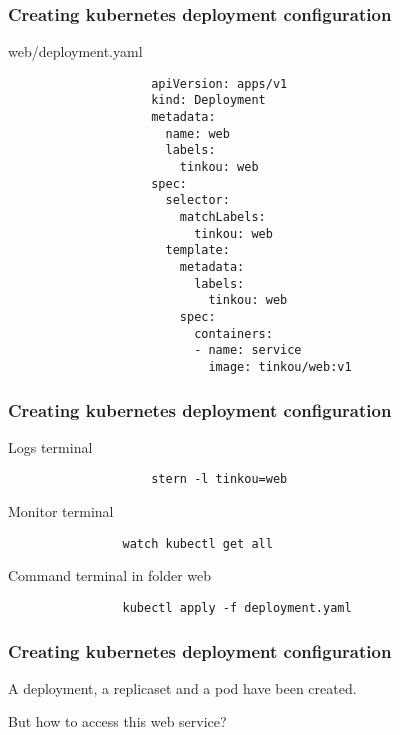 	\begin{frame}[fragile]
		\frametitle{Creating kubernetes deployment configuration}
		\begin{block}{web/deployment.yaml}
			\begin{tiny}
				\begin{verbatim}
					apiVersion: apps/v1
					kind: Deployment
					metadata:
					  name: web
					  labels:
					    tinkou: web
					spec:
					  selector:
					    matchLabels:
					      tinkou: web
					  template:
					    metadata:
					      labels:
					        tinkou: web
					    spec:
					      containers:
					      - name: service
					        image: tinkou/web:v1
				\end{verbatim}
			\end{tiny}
		\end{block}
	\end{frame}
	
	\begin{frame}[fragile]
		\frametitle{Creating kubernetes deployment configuration}

		\begin{block}{Logs terminal}
			\begin{small}
				\begin{verbatim}
					stern -l tinkou=web
				\end{verbatim}
			\end{small}
		\end{block}
		
		\begin{block}{Monitor terminal}
			\begin{verbatim}
				watch kubectl get all
			\end{verbatim}
		\end{block}
		
		\begin{block}{Command terminal in folder web}
			\begin{verbatim}
				kubectl apply -f deployment.yaml
			\end{verbatim}
		\end{block}
	\end{frame}
	
	\begin{frame}
		\frametitle{Creating kubernetes deployment configuration}
		
		A deployment, a replicaset and a pod have been created.
		
		\bigskip
		
		But how to access this web service?
	\end{frame}
	
